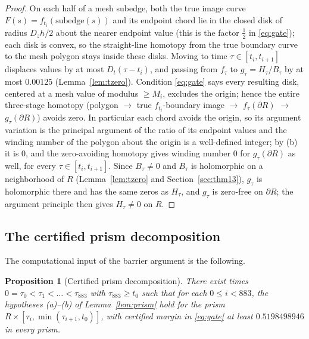 \documentclass[11pt]{article}
\newtheorem{proposition}[theorem]{Proposition}
\theoremstyle{definition}
\begin{document}
\begin{proof}
On each half of a mesh subedge, both the true image curve
$F(s)=f_{t_i}(\text{subedge}(s))$ and its endpoint chord lie in the
closed disk of radius $D_{z}h/2$ about the nearer endpoint value
(this is the factor $\frac12$ in \eqref{eq:gate}); each disk is
convex, so the straight-line homotopy from the true boundary curve
to the mesh polygon stays inside these disks. Moving to time
$\tau\in[t_i,t_{i+1}]$ displaces values by at most
$D_{t}(\tau-t_i)$, and passing from $f_\tau$ to
$g_\tau=H_\tau/B_\tau$ by at most $0.00125$
(Lemma~\ref{lem:tzero}). Condition \eqref{eq:gate} says every
resulting disk, centered at a mesh value of modulus $\ge M_i$,
excludes the origin; hence the entire three-stage homotopy (polygon
$\to$ true $f_{t_i}$-boundary image $\to$ $f_\tau(\partial R)$ $\to$
$g_\tau(\partial R)$) avoids zero. In particular each chord avoids
the origin, so its argument variation is the principal argument of
the ratio of its endpoint values and the winding number of the
polygon about the origin is a well-defined integer; by (b) it is
$0$, and the zero-avoiding homotopy gives winding number $0$ for
$g_\tau(\partial R)$ as well, for every $\tau\in[t_i,t_{i+1}]$.
Since $B_\tau\neq0$ and $B_\tau$ is holomorphic on a neighborhood
of $R$ (Lemma~\ref{lem:tzero} and Section~\ref{sec:thm13}),
$g_\tau$ is holomorphic there and has the same zeros as $H_\tau$,
and $g_\tau$ is zero-free on $\partial R$; the argument principle
then gives $H_\tau\neq0$ on $R$.
\end{proof}

\subsection{The certified prism decomposition}\label{sec:prismcert}

The computational input of the barrier argument is the following.

\begin{proposition}[Certified prism decomposition]\label{prop:prismcert}
There exist times $0=\tau_0<\tau_1<\dots<\tau_{883}$ with
$\tau_{883}\ge t_0$ such that for each $0\le i<883$, the
hypotheses (a)--(b) of Lemma~\ref{lem:prism} hold for the prism
$R\times[\tau_i,\min(\tau_{i+1},t_0)]$, with certified margin in
\eqref{eq:gate} at least $0.5198498946$ in every prism.
\end{proposition}
\end{document}
